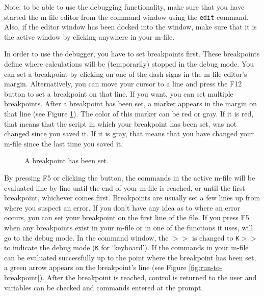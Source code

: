 Note: to be able to use the debugging functionality, make sure that you have started the m-file editor from the command window using the {\tt edit} command. Also, if the editor window has been docked into the \MATLAB{} window, make sure that it is the active window by clicking anywhere in your m-file.

In order to use the debugger, you have to set breakpoints first. These breakpoints define where calculations will be (temporarily) stopped in the debug mode. You can set a breakpoint by clicking on one of the dash signs in the m-file editor's margin. Alternatively, you can move your cursor to a line and press the F12 button to set a breakpoint on that line. If you want, you can set multiple breakpoints. After a breakpoint has been set, a marker appears in the margin on that line (see Figure \ref{fig:set-breakpoint}). The color of this marker can be red or gray. If it is red, that means that the script in which your breakpoint has been set, was not changed since you saved it. If it is gray, that means that you have changed your m-file since the last time you saved it. 



\begin{figure}[!ht]
  \centering
  \caption{A breakpoint has been set.}\label{fig:set-breakpoint}
\end{figure}


\noindent By pressing F5 or clicking the  button, the commands in the active m-file will be evaluated line by line until the end of your m-file is reached, or until the first breakpoint, whichever comes first. Breakpoints are usually set a few lines up from where you suspect an error. If you don't have any idea as to where an error occurs, you can set your breakpoint on the first line of the file. If you press F5 when any breakpoints exist in your m-file or in one of the functions it uses, \MATLAB{} will go to the debug mode. In the command window, the {\tt $>>$} is changed to {\tt K$>>$} to indicate the debug mode ({\tt K} for `keyboard'). If the commands in your m-file can be evaluated successfully up to the point where the breakpoint has been set, a green arrow appears on the breakpoint's line (see Figure \ref{fig:run-to-breakpoint}). After the breakpoint is reached, control is returned to the user and variables can be checked and commands entered at the prompt.

